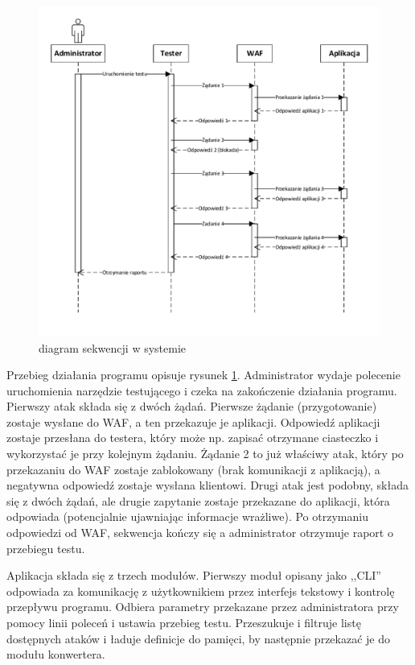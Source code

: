 \documentclass[11pt,a4paper,polish,thesis,oneside]{dcsbook}
\begin{document}
\begin{figure}
\centering
\centerline{\includegraphics{schemat.pdf}}
\caption{diagram sekwencji w systemie}
\label{fig:przeplyw}
\end{figure}


Przebieg działania programu opisuje rysunek \ref{fig:przeplyw}. Administrator wydaje polecenie uruchomienia narzędzie testującego i czeka na zakończenie działania programu. Pierwszy atak składa się z dwóch żądań. Pierwsze żądanie (przygotowanie) zostaje wysłane do WAF, a ten przekazuje je aplikacji. Odpowiedź aplikacji zostaje przesłana do testera, który może np. zapisać otrzymane ciasteczko i wykorzystać je przy kolejnym żądaniu. Żądanie 2 to już właściwy atak, który po przekazaniu do WAF zostaje zablokowany (brak komunikacji z aplikacją), a negatywna odpowiedź zostaje wysłana klientowi. Drugi atak jest podobny, składa się z dwóch żądań, ale drugie zapytanie zostaje przekazane do aplikacji, która odpowiada (potencjalnie ujawniając informacje wrażliwe). Po otrzymaniu odpowiedzi od WAF, sekwencja kończy się a administrator otrzymuje raport o przebiegu testu.

Aplikacja składa się z trzech modułów. Pierwszy moduł opisany jako ,,CLI'' odpowiada za komunikację z użytkownikiem przez interfejs tekstowy i kontrolę przepływu programu. Odbiera parametry przekazane przez administratora przy pomocy linii poleceń i ustawia przebieg testu. Przeszukuje i filtruje listę dostępnych ataków i ładuje definicje do pamięci, by następnie przekazać je do modułu konwertera.
\end{document}
